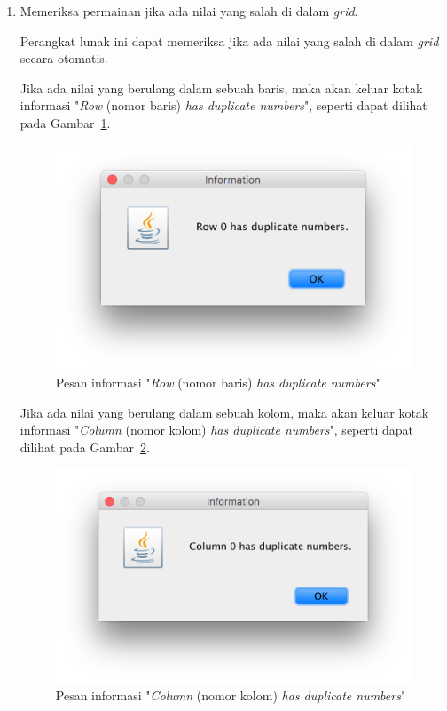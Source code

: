 \begin{enumerate}
\item Memeriksa permainan jika ada nilai yang salah di dalam \textit{grid}.

Perangkat lunak ini dapat memeriksa jika ada nilai yang salah di dalam \textit{grid} secara otomatis.

Jika ada nilai yang berulang dalam sebuah baris, maka akan keluar kotak informasi "\textit{Row} (nomor baris) \textit{has duplicate numbers}", seperti dapat dilihat pada Gambar~\ref{fig:rowduplicate}.

\begin{figure}
\centering
\captionsetup{justification=centering}
\includegraphics[scale=0.5]{Gambar/ImplementasiPengujian/RowDuplicate.png}
\caption[Pesan informasi "\textit{Row} (nomor baris) {has duplicate numbers}"]{Pesan informasi "\textit{Row} (nomor baris) \textit{has duplicate numbers}"}
\label{fig:rowduplicate}
\end{figure}

Jika ada nilai yang berulang dalam sebuah kolom, maka akan keluar kotak informasi "\textit{Column} (nomor kolom) \textit{has duplicate numbers}", seperti dapat dilihat pada Gambar~\ref{fig:columnduplicate}.

\begin{figure}
\centering
\captionsetup{justification=centering}
\includegraphics[scale=0.5]{Gambar/ImplementasiPengujian/ColumnDuplicate.png}
\caption[Pesan informasi "\textit{Column} (nomor kolom) {has duplicate numbers}"]{Pesan informasi "\textit{Column} (nomor kolom) \textit{has duplicate numbers}"}
\label{fig:columnduplicate}
\end{figure}


\end{enumerate}
